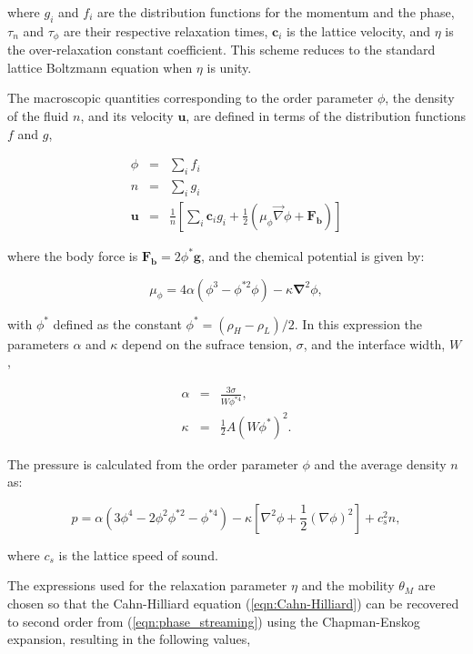 \documentclass[12pt]{report}
\newcommand{\vect}[1]{\ensuremath{\mathrm{\mathbf{#1}}}}
\begin{document}
where $g_i$ and $f_i$ are the distribution functions for the momentum and the phase, $\tau_n$ and $\tau_\phi$ are their respective relaxation times,  $\vect{c}_{i}$ is the lattice velocity, and $\eta$ is the over-relaxation constant coefficient. This scheme reduces to the standard lattice Boltzmann equation when $\eta$ is unity.

The macroscopic quantities corresponding to the order parameter $\phi$, the density of the fluid $n$, and its velocity $\vect{u}$, are defined in terms of the distribution functions $f$ and $g$,

\begin{eqnarray}
\phi &=& \sum_i{f_i}\\ 
n &=& \sum_i{g_i}\\ 
\vect{u} &=& \frac{1}{n}\left[\sum_i{\vect{c}_ig_i} + \frac{1}{2}\left(\mu_\phi\vec{\nabla}\phi + \vect{F_b}\right)\right]
\label{eqn:macroscopic_values}
\end{eqnarray}

where the body force is $\vect{F_b} = 2\phi^*\vect{g}$, and the chemical potential is given by:

\begin{equation}
  \mu_{\phi} = 4\alpha(\phi^3 - \phi^{*2}\phi) - \kappa \vect{{\nabla}}^2\phi,
\label{eqn:chemical_potential}
\end{equation}

with $\phi^*$ defined as the constant $\phi^* = (\rho_H - \rho_L)/2$. In this expression the parameters $\alpha$ and $\kappa$ depend on the sufrace tension, $\sigma$, and the interface width, $W$ \cite{Zheng2006},

\begin{eqnarray}
  \alpha &=& \frac{3\sigma}{W\phi^{*4}},\\
  \kappa &=& \frac{1}{2}A(W\phi^{*})^2.
\end{eqnarray}

The pressure is calculated from the order parameter $\phi$ and the average density $n$ as:

\begin{equation}
p = \alpha\left( 3\phi^4 - 2\phi^2\phi^{*2} - \phi^{*4} \right) 
  - \kappa\left[ \nabla^2\phi +\frac{1}{2}\left( \nabla\phi\right)^2 \right] + c_s^2n,
\end{equation}

where $c_s$ is the lattice speed of sound. 

The expressions used for the relaxation parameter $\eta$ and the mobility $\theta_{M}$ are chosen so that the Cahn-Hilliard equation (\ref{eqn:Cahn-Hilliard}) can be recovered to second order from (\ref{eqn:phase_streaming}) using the Chapman-Enskog expansion, resulting in the following values,
\end{document}
